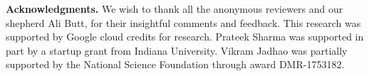 

\noindent \textbf{Acknowledgments.} We wish to thank all the anonymous reviewers and our shepherd Ali Butt, for  their insightful comments and feedback.
This research was supported by Google cloud credits for research. 
Prateek Sharma was supported in part by a startup grant from Indiana University. Vikram Jadhao was partially supported by the National Science Foundation through award DMR-1753182.





